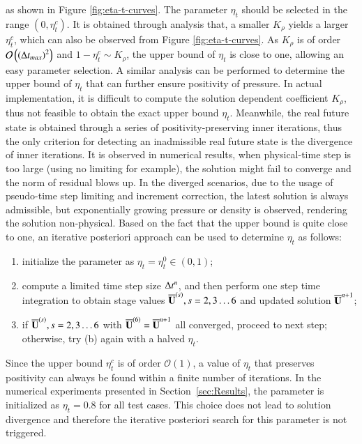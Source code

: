 as shown in Figure \ref{fig:eta-t-curves}.
The parameter $\eta_t$ should be selected in the range $\left(0,\eta^c_t\right)$. 
It is obtained through analysis that, 
a smaller $K_\rho$ yields a larger $\eta^c_t$,
which can also be observed from Figure \ref{fig:eta-t-curves}. 
As $K_\rho$ is of 
order $\mathcal{O}\left(\left(\mathrm\Delta t_{max}\right)^2\right)$
and $1-\eta_t^c\sim K_\rho$,
the upper bound of $\eta_t$ is close to one, allowing an easy parameter selection. 
A similar analysis can be performed to determine the upper bound of $\eta_t$ that can further ensure positivity of pressure. 
In actual implementation, it is difficult to compute the solution dependent coefficient $K_\rho$, thus not feasible to obtain the exact upper bound $\eta_t$. 
Meanwhile, the real future state is 
obtained through a series of positivity-preserving inner iterations,
thus the only criterion for detecting an inadmissible real future 
state is the divergence of inner iterations.
It is observed in numerical results, when physical-time step is 
too large (using no limiting for example), the solution might   
fail to converge and the norm of residual blows up. 
In the diverged scenarios, due to the usage of pseudo-time step limiting 
and increment correction, the latest solution is always admissible, 
but exponentially growing pressure or density is observed, rendering the 
solution non-physical. 
Based on the fact that the upper bound is quite close to one, an 
iterative posteriori approach can be used to determine $\eta_t$ as follows:
\begin{enumerate} [label=(\alph*)]
    \item initialize the parameter as $\eta_t= \eta^0_t \in \left(0,1\right)$;
    \item compute a limited time step size $\mathrm\Delta t^n$, and then perform one step time integration to obtain stage values $\overline{\mathbf{U}}^{(s)},s=2,3\dots6$ and updated solution $\overline{\mathbf{U}}^{n+1}$;
    \item if $\overline{\mathbf{U}}^{(s)},s=2,3\dots6$ with $\overline{\mathbf{U}}^{(6)}=\overline{\mathbf{U}}^{n+1}$ all converged, proceed to next step; otherwise, try (b) again with a halved $\eta_t$.
\end{enumerate}
Since the upper bound $\eta^c_t$ is of order $\mathcal{O}(1)$, a value of $\eta_t$ that preserves positivity can always be found within a finite number of iterations. 
In the numerical experiments presented in Section~\ref{sec:Results}, the parameter is initialized as $\eta_t = 0.8$ for all test cases. 
This choice does not lead to solution divergence and therefore the iterative posteriori search for this parameter is not triggered.

